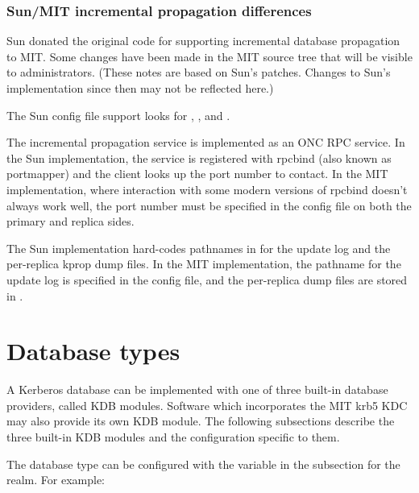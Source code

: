 \documentclass[letterpaper,10pt,english]{sphinxmanual}
\begin{document}
\subsection{Sun/MIT incremental propagation differences}
\label{\detokenize{admin/database:sun-mit-incremental-propagation-differences}}
Sun donated the original code for supporting incremental database
propagation to MIT.  Some changes have been made in the MIT source
tree that will be visible to administrators.  (These notes are based
on Sun’s patches.  Changes to Sun’s implementation since then may not
be reflected here.)

The Sun config file support looks for ,
, and .

The incremental propagation service is implemented as an ONC RPC
service.  In the Sun implementation, the service is registered with
rpcbind (also known as portmapper) and the client looks up the port
number to contact.  In the MIT implementation, where interaction with
some modern versions of rpcbind doesn’t always work well, the port
number must be specified in the config file on both the primary and
replica sides.

The Sun implementation hard-codes pathnames in  for the
update log and the per-replica kprop dump files.  In the MIT
implementation, the pathname for the update log is specified in the
config file, and the per-replica dump files are stored in
{\hyperref[\detokenize{mitK5defaults:paths}]{}}.


\chapter{Database types}
\label{\detokenize{admin/dbtypes::doc}}\label{\detokenize{admin/dbtypes:database-types}}\label{\detokenize{admin/dbtypes:dbtypes}}
A Kerberos database can be implemented with one of three built-in
database providers, called KDB modules.  Software which incorporates
the MIT krb5 KDC may also provide its own KDB module.  The following
subsections describe the three built-in KDB modules and the
configuration specific to them.

The database type can be configured with the  variable
in the {\hyperref[\detokenize{admin/conf_files/kdc_conf:dbmodules}]{}} subsection for the realm.  For example:
\end{document}
